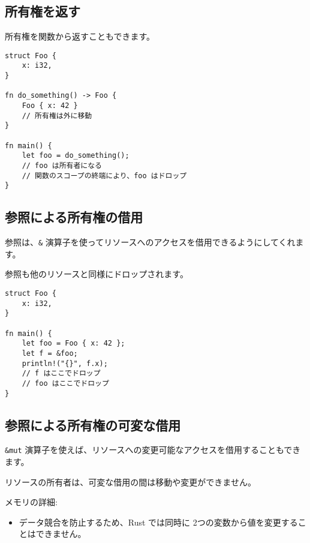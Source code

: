 \subsection{所有権を返す}

所有権を関数から返すこともできます。

\begin{verbatim}
struct Foo {
    x: i32,
}

fn do_something() -> Foo {
    Foo { x: 42 }
    // 所有権は外に移動
}

fn main() {
    let foo = do_something();
    // foo は所有者になる
    // 関数のスコープの終端により、foo はドロップ
}
\end{verbatim}

\subsection{参照による所有権の借用}

参照は、\texttt{\&}
演算子を使ってリソースへのアクセスを借用できるようにしてくれます。

参照も他のリソースと同様にドロップされます。

\begin{verbatim}
struct Foo {
    x: i32,
}

fn main() {
    let foo = Foo { x: 42 };
    let f = &foo;
    println!("{}", f.x);
    // f はここでドロップ
    // foo はここでドロップ
}
\end{verbatim}

\subsection{参照による所有権の可変な借用}

\texttt{\&mut}
演算子を使えば、リソースへの変更可能なアクセスを借用することもできます。

リソースの所有者は、可変な借用の間は移動や変更ができません。

メモリの詳細:

\begin{itemize}
\item
  データ競合を防止するため、Rust では同時に
  2つの変数から値を変更することはできません。
\end{itemize}

